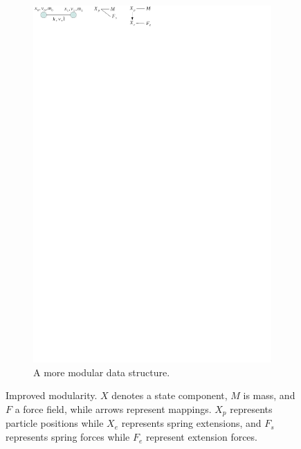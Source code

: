 \begin{figure}
\begin{subfigure}[t]{0.3\linewidth}
   \includegraphics[clip,trim=80mm 280mm 100mm 0mm]{mass-spring.pdf}
   \caption{A more modular data structure.} \label{fig mass-spring-flexible}
 \end{subfigure}
 \caption{Improved modularity. $X$ denotes a state component, $M$ is mass, and $F$ a force field, while arrows represent mappings. $X_p$ represents particle positions while $X_e$ represents spring extensions, and $F_s$ represents spring forces while $F_e$ represent extension forces.}
 \label{fig modularity mass-spring}
\end{figure}



